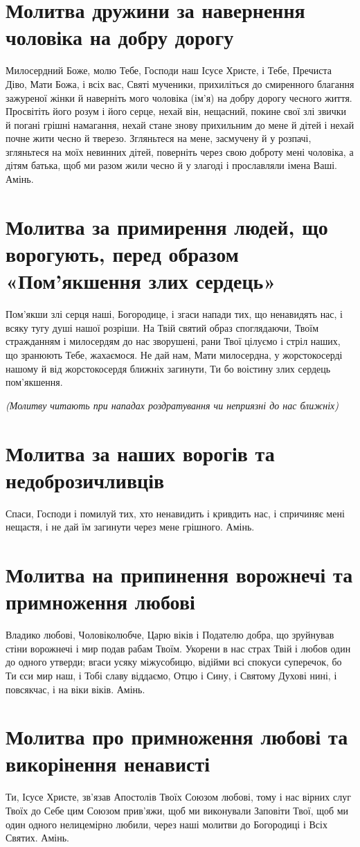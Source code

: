 \documentclass[chapters.tex]{subfiles}
\begin{document}
\section{Молитва дружини за навернення чоловіка на добру дорогу}
Милосердний Боже, молю Тебе, Господи наш Ісусе Христе, і Тебе, Пречиста Діво, Мати Божа, і всіх вас, Святі мученики, прихиліться до смиренного благання зажуреної жінки й наверніть мого чоловіка (ім’я) на добру дорогу чесного життя. Просвітіть його розум і його серце, нехай він, нещасний, покине свої злі звички й погані грішні намагання, нехай стане знову прихильним до мене й дітей і нехай почне жити чесно й тверезо. Згляньтеся на мене, засмучену й у розпачі, згляньтеся на моїх невинних дітей, поверніть через свою доброту мені чоловіка, а дітям батька, щоб ми разом жили чесно й у злагоді і прославляли імена Ваші. Амінь.

\section{Молитва за примирення людей, що ворогують, перед образом «Пом’якшення злих сердець»}
Пом’якши злі серця наші, Богородице, і згаси напади тих, що ненавидять нас, і всяку тугу душі нашої розріши. На Твій святий образ споглядаючи, Твоїм стражданням і милосердям до нас зворушені, рани Твої цілуємо і стріл наших, що зранюють Тебе, жахаємося. Не дай нам, Мати милосердна, у жорстокосерді нашому й від жорстокосердя ближніх загинути, Ти бо воістину злих сердець пом’якшення.

\emph{(Молитву читають при нападах роздратування чи неприязні до нас ближніх)}

\section{Молитва за наших ворогів та недоброзичливців}
Спаси, Господи і помилуй тих, хто ненавидить і кривдить нас, і спричиняє мені нещастя, і не дай їм загинути через мене грішного. Амінь.

\section{Молитва на припинення ворожнечі та примноження любові}
Владико любові, Чоловіколюбче, Царю віків і Подателю добра, що зруйнував стіни ворожнечі і мир подав рабам Твоїм. Укорени в нас страх Твій і любов один до одного утверди; вгаси усяку міжусобицю, відійми всі спокуси суперечок, бо Ти єси мир наш, і Тобі славу віддаємо, Отцю і Сину, і Святому Духові нині, і повсякчас, і на віки віків. Амінь.

\section{Молитва про примноження любові та викорінення ненависті}
Ти, Ісусе Христе, зв’язав Апостолів Твоїх Союзом любові, тому і нас вірних слуг Твоїх до Себе цим Союзом прив’яжи, щоб ми виконували Заповіти Твої, щоб ми один одного нелицемірно любили, через наші молитви до Богородиці і Всіх Святих. Амінь.
\end{document}
